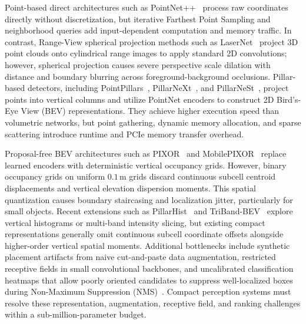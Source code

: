 Point-based direct architectures such as PointNet++~\cite{qi2017pointnetplusplus} process raw coordinates directly without discretization, but iterative Farthest Point Sampling and neighborhood queries add input-dependent computation and memory traffic. In contrast, Range-View spherical projection methods such as LaserNet~\cite{meyer2019lasernet} project 3D point clouds onto cylindrical range images to apply standard 2D convolutions; however, spherical projection causes severe perspective scale dilation with distance and boundary blurring across foreground-background occlusions. Pillar-based detectors, including PointPillars~\cite{lang2019pointpillars}, PillarNeXt~\cite{li2023pillarnext}, and PillarNeSt~\cite{mao2023pillarnest}, project points into vertical columns and utilize PointNet encoders to construct 2D Bird's-Eye View (BEV) representations. They achieve higher execution speed than volumetric networks, but point gathering, dynamic memory allocation, and sparse scattering introduce runtime and PCIe memory transfer overhead.

Proposal-free BEV architectures such as PIXOR~\cite{yang2018pixor} and MobilePIXOR~\cite{nguyen2024indoor} replace learned encoders with deterministic vertical occupancy grids. However, binary occupancy grids on uniform $0.1\,\text{m}$ grids discard continuous subcell centroid displacements and vertical elevation dispersion moments. This spatial quantization causes boundary staircasing and localization jitter, particularly for small objects. Recent extensions such as PillarHist~\cite{zhou2025pillarhist} and TriBand-BEV~\cite{khoshkdahan2026triband} explore vertical histograms or multi-band intensity slicing, but existing compact representations generally omit continuous subcell coordinate offsets alongside higher-order vertical spatial moments. Additional bottlenecks include synthetic placement artifacts from naive cut-and-paste data augmentation, restricted receptive fields in small convolutional backbones, and uncalibrated classification heatmaps that allow poorly oriented candidates to suppress well-localized boxes during Non-Maximum Suppression (NMS)~\cite{li2020gfl}. Compact perception systems must resolve these representation, augmentation, receptive field, and ranking challenges within a sub-million-parameter budget.

